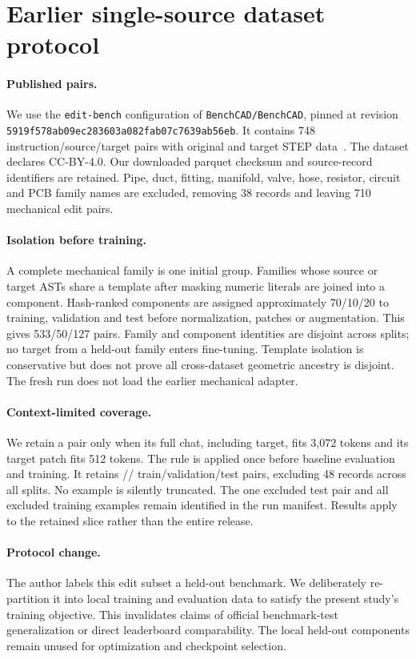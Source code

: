 \section{Earlier single-source dataset protocol}
\label{sec:earlier-data}
\paragraph{Published pairs.}
We use the \texttt{edit-bench} configuration of \texttt{BenchCAD/BenchCAD}, pinned at revision \texttt{5919f578ab09ec283603a082fab07c7639ab56eb}. It contains 748 instruction/source/target pairs with original and target STEP data~\cite{benchcad2026}. The dataset declares CC-BY-4.0. Our downloaded parquet checksum and source-record identifiers are retained. Pipe, duct, fitting, manifold, valve, hose, resistor, circuit and PCB family names are excluded, removing 38 records and leaving 710 mechanical edit pairs.

\paragraph{Isolation before training.}
A complete mechanical family is one initial group. Families whose source or target ASTs share a template after masking numeric literals are joined into a component. Hash-ranked components are assigned approximately 70/10/20 to training, validation and test before normalization, patches or augmentation. This gives 533/50/127 pairs. Family and component identities are disjoint across splits; no target from a held-out family enters fine-tuning. Template isolation is conservative but does not prove all cross-dataset geometric ancestry is disjoint. The fresh run does not load the earlier mechanical adapter.

\paragraph{Context-limited coverage.}
We retain a pair only when its full chat, including target, fits 3,072 tokens and its target patch fits 512 tokens. The rule is applied once before baseline evaluation and training. It retains \onlineTrain{}/\onlineValid{}/\onlineTest{} train/validation/test pairs, excluding 48 records across all splits. No example is silently truncated. The one excluded test pair and all excluded training examples remain identified in the run manifest. Results apply to the retained slice rather than the entire release.

\paragraph{Protocol change.}
The author labels this edit subset a held-out benchmark. We deliberately re-partition it into local training and evaluation data to satisfy the present study's training objective. This invalidates claims of official benchmark-test generalization or direct leaderboard comparability. The local held-out components remain unused for optimization and checkpoint selection.

